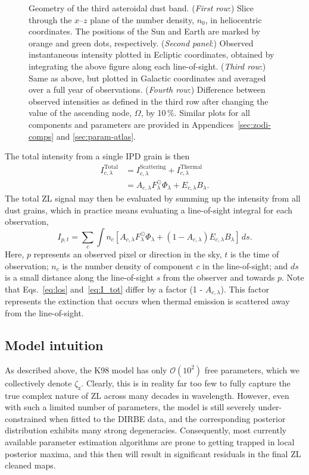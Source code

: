 \documentclass[twocolumn]{aa}
\begin{document}
\begin{figure}
  \caption{Geometry of the third asteroidal dust band. (\textit{First row}:)
    Slice through the $x$--$z$ plane of the number density, $n_{0}$,
    in heliocentric coordinates. The positions of the Sun and Earth
    are marked by orange and green dots, respectively. (\textit{Second
    panel}:) Observed instantaneous intensity plotted in Ecliptic
    coordinates, obtained by integrating the above figure along each
    line-of-sight. (\textit{Third row}:) Same as above, but plotted in
  Galactic coordinates and averaged over a full year of
  observations. (\textit{Fourth row}:) Difference between observed
  intensities as defined in the third row after changing the value of
  the ascending node, $\Omega$, by 10\,\%. Similar plots for all
  components and parameters are provided in Appendices~\ref{sec:zodi-comps} and \ref{sec:param-atlas}.}
  \label{fig:band3}
\end{figure}

The total intensity from a single IPD grain is then
\begin{align}\label{eq:I_tot}
    I^\mathrm{Total}_{c, \lambda} &= I^\mathrm{Scattering}_{c,\lambda} + I^\mathrm{Thermal}_{c,\lambda}\\
    &= A_{c, \lambda} F_\lambda^\odot \Phi_\lambda + E_{c,\lambda} B_\lambda.
\end{align}
The total ZL signal may then be evaluated by summing up the intensity
from all dust grains, which in practice means evaluating a line-of-sight 
integral for each observation,
\begin{equation}\label{eq:los}
    I_{p,t} = \sum_c \int n_c \left[  A_{c, \lambda} F_\lambda^\odot \Phi_\lambda + \left( 1 - A_{c, \lambda} \right) E_{c,\lambda} B_\lambda \right]\,ds.
\end{equation}
Here, $p$ represents an observed pixel or direction in the sky, $t$ is
the time of observation; $n_c$ is the number density of component $c$
in the line-of-sight; and $ds$ is a small distance along the
line-of-sight $s$ from the observer and towards $p$. Note that
Eqs.~\eqref{eq:los} and~\eqref{eq:I_tot} differ by a factor (1 -
$A_{c, \lambda}$). This factor represents the extinction that occurs
when thermal emission is scattered away from the line-of-sight.

\subsection{Model intuition}

As described above, the K98 model has only $\mathcal{O}(10^2)$ free
parameters, which we collectively denote
$\zeta_{\mathrm{z}}$. Clearly, this is in reality far too few to fully
capture the true complex nature of ZL across many decades in
wavelength. However, even with such a limited number of parameters,
the model is still severely under-constrained when fitted to the DIRBE
data, and the corresponding posterior distribution exhibits many
strong degeneracies. Consequently, most currently available parameter
estimation algorithms are prone to getting trapped in local posterior
maxima, and this then will result in significant residuals in the
final ZL cleaned maps.
\end{document}
